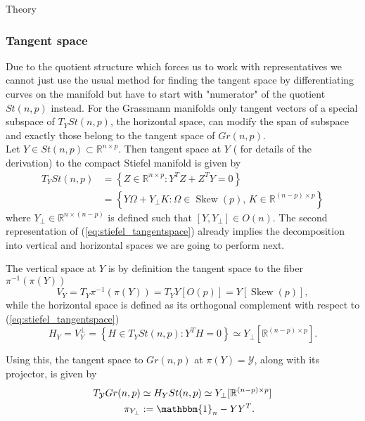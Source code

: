 \begin{chapter}{Theory}
\subsubsection{Tangent space} %
\label{ssub:Tangent space}
Due to the quotient structure which forces us to work with representatives we cannot just use the usual method for finding the tangent space by differentiating
curves on the manifold but have to start with "numerator" of the quotient $St(n,p)$ instead. For the Grassmann manifolds only tangent vectors of a special subspace of $T_YSt(n,p)$,
the horizontal space, can modify the span of subspace and exactly those belong to the tangent space of $Gr(n,p)$. \\

Let $Y\in St(n,p)\subset\mathbb{R}^{n\times p}$. Then tangent space at $Y$ (\cite{Absil2009} for details of the derivation) to the compact Stiefel manifold is given by
\begin{align}
    \label{eq:stiefel_tangentspace}
   T_YSt(n,p)	&= \left\lbrace Z\in\mathbb{R}^{n\times p}: Y^TZ+Z^TY=0 \right\rbrace\\
   &=  \left\lbrace Y\Omega + Y_{\bot}K: \Omega\in\operatorname{Skew}(p),\, K\in\mathbb{R}^{(n-p)\times p} \right\rbrace\nonumber
\end{align}
where $Y_{\bot}\in\mathbb{R}^{n\times (n-p)}$ is defined such that $[Y,Y_{\bot}]\in O(n)$. The second representation of (\ref{eq:stiefel_tangentspace})
already implies the decomposition into vertical and horizontal spaces we are going to perform next.

The vertical space at $Y$ is by definition the tangent space to the fiber $\pi^{-1}(\pi(Y))$
\begin{equation}
    \label{eq:stiefel_horizontalspace}
    V_Y = T_Y\pi^{-1}(\pi(Y))=T_YY[O(p)]=Y[\operatorname{Skew}(p)],
\end{equation}
while the horizontal space is defined as its orthogonal complement with respect to (\ref{eq:stiefel_tangentspace})
\begin{equation}
    \label{eq:stiefel_verticalspace}
    H_Y=V_Y^{\bot} =\left\lbrace H\in T_Y St(n,p):Y^TH=0 \right\rbrace \simeq Y_{\bot}[\mathbb{R}^{(n-p)\times p}].
\end{equation}

Using this, the tangent space to $Gr(n,p)$ at $\pi(Y)=\mathcal{Y}$, along with its projector, is given by 
\begin{align}
    \label{eq:grassmann_tangentspace}
    T_{\mathcal{Y}}Gr(n,p)&\simeq  H_YSt(n,p)\simeq Y_{\bot}[\mathbb{R}^{(n-p)\times p}]\\
    \pi_{Y_{\bot}}&:=\mathbbm{1}_n-YY^T.
\end{align}


\end{chapter}
